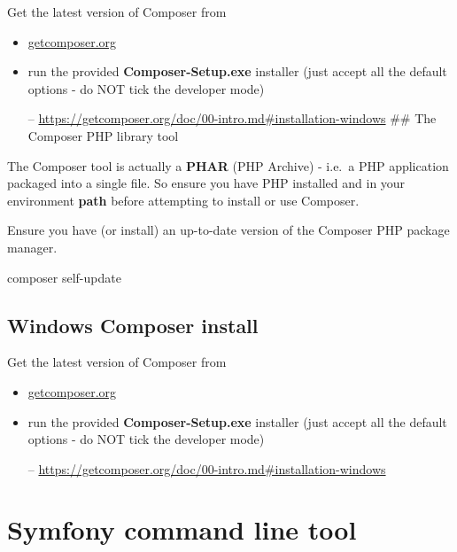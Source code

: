 \documentclass[a4paperpaper,openright]{book}
\newenvironment{Shaded}{}{}
\newcommand{\ExtensionTok}[1]{#1}
\newcommand{\NormalTok}[1]{#1}
\begin{document}
Get the latest version of Composer from

\begin{itemize}
\item
  \href{https://getcomposer.org/}{getcomposer.org}
\item
  run the provided \textbf{Composer-Setup.exe} installer (just accept
  all the default options - do NOT tick the developer mode)

  -- \url{https://getcomposer.org/doc/00-intro.md\#installation-windows}
  \#\# The Composer PHP library tool
\end{itemize}

The Composer tool is actually a \textbf{PHAR} (PHP Archive) - i.e.~a PHP
application packaged into a single file. So ensure you have PHP
installed and in your environment \textbf{path} before attempting to
install or use Composer.

Ensure you have (or install) an up-to-date version of the Composer PHP
package manager.

\begin{Shaded}
\begin{Highlighting}[]
    \ExtensionTok{composer}\NormalTok{ self-update}
\end{Highlighting}
\end{Shaded}

\hypertarget{windows-composer-install-1}{%
\subsection{Windows Composer install}\label{windows-composer-install-1}}

Get the latest version of Composer from

\begin{itemize}
\item
  \href{https://getcomposer.org/}{getcomposer.org}
\item
  run the provided \textbf{Composer-Setup.exe} installer (just accept
  all the default options - do NOT tick the developer mode)

  -- \url{https://getcomposer.org/doc/00-intro.md\#installation-windows}
\end{itemize}

\hypertarget{symfony-command-line-tool}{%
\section{Symfony command line tool}\label{symfony-command-line-tool}}
\end{document}
